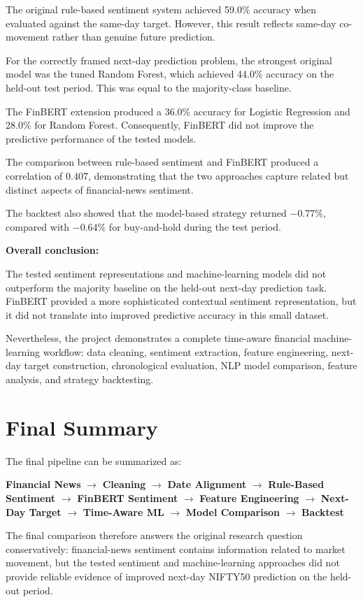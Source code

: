\documentclass[10pt,a4paper]{article}
\begin{document}
	The original rule-based sentiment system achieved 59.0\% accuracy when
	evaluated against the same-day target. However, this result reflects
	same-day co-movement rather than genuine future prediction.
	
	For the correctly framed next-day prediction problem, the strongest
	original model was the tuned Random Forest, which achieved 44.0\%
	accuracy on the held-out test period. This was equal to the
	majority-class baseline.
	
	The FinBERT extension produced a 36.0\% accuracy for Logistic
	Regression and 28.0\% for Random Forest. Consequently, FinBERT did not
	improve the predictive performance of the tested models.
	
	The comparison between rule-based sentiment and FinBERT produced a
	correlation of 0.407, demonstrating that the two approaches capture
	related but distinct aspects of financial-news sentiment.
	
	The backtest also showed that the model-based strategy returned
	$-0.77\%$, compared with $-0.64\%$ for buy-and-hold during the test
	period.
	
	\begin{keybox}
		\textbf{\color{Navy}Overall conclusion:}
		
		The tested sentiment representations and machine-learning models
		did not outperform the majority baseline on the held-out next-day
		prediction task. FinBERT provided a more sophisticated contextual
		sentiment representation, but it did not translate into improved
		predictive accuracy in this small dataset.
		
		Nevertheless, the project demonstrates a complete time-aware
		financial machine-learning workflow: data cleaning, sentiment
		extraction, feature engineering, next-day target construction,
		chronological evaluation, NLP model comparison, feature analysis,
		and strategy backtesting.
	\end{keybox}
	
	\section{Final Summary}
	
	The final pipeline can be summarized as:
	
	\begin{center}
		\small
		\textbf{Financial News}
		$\rightarrow$
		\textbf{Cleaning}
		$\rightarrow$
		\textbf{Date Alignment}
		$\rightarrow$
		\textbf{Rule-Based Sentiment}
		$\rightarrow$
		\textbf{FinBERT Sentiment}
		$\rightarrow$
		\textbf{Feature Engineering}
		$\rightarrow$
		\textbf{Next-Day Target}
		$\rightarrow$
		\textbf{Time-Aware ML}
		$\rightarrow$
		\textbf{Model Comparison}
		$\rightarrow$
		\textbf{Backtest}
	\end{center}
	
	The final comparison therefore answers the original research question
	conservatively: financial-news sentiment contains information related
	to market movement, but the tested sentiment and machine-learning
	approaches did not provide reliable evidence of improved next-day
	NIFTY50 prediction on the held-out period.
	
\end{document}
